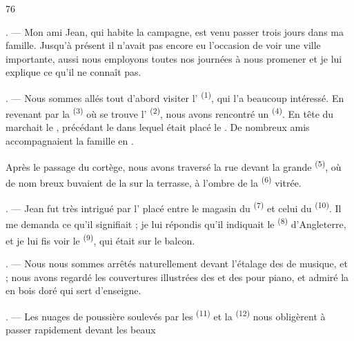 \begin{VUpage}[78]{76}
\VUsaut{4.0mm}
\VUsaut{3.0mm}

\VUsaut{3.0mm}

. --- Mon ami Jean, qui habite la campagne, est venu\nl
passer trois jours dans ma famille. Jusqu'à présent il\nl
n'avait pas encore eu l'occasion de voir une ville\nl
importante, aussi nous employons toutes nos journées\nl
à nous promener et je lui explique ce qu'il ne connaît\nl
pas.

. --- Nous sommes allés tout d'abord visiter\nl
l' \textsuperscript{(1)}, qui l'a beaucoup intéressé. En\nl
revenant par la  \textsuperscript{(3)} où se trouve l'\nl
{} \textsuperscript{(2)}, nous avons rencontré un \cc
{} \textsuperscript{(4)}. En tête du  marchait le\nl
{}, précédant le  dans lequel était\nl
placé le . De nombreux amis accompagnaient\nl
la famille en .

\VUblancAlinea
Après le passage du cortège, nous avons traversé\nl
la rue devant la grande  \textsuperscript{(5)}, où de nom\cc
breux  buvaient de la  sur la\nl
terrasse, à l'ombre de la  \textsuperscript{(6)} vitrée.

. --- Jean fut très intrigué par l' placé\nl
entre le magasin du  \textsuperscript{(7)} et celui du \cc
{} \textsuperscript{(10)}. Il me demanda ce qu'il\nl
signifiait ; je lui répondis qu'il indiquait le \textsuperscript{(8)}\nl
d'Angleterre, et je lui fis voir le  \textsuperscript{(9)}, qui était\nl
sur le balcon.

. --- Nous nous sommes arrêtés naturellement\nl
devant l'étalage des  de musique, \cc
{} et  ; nous avons regardé\nl
les couvertures illustrées des  et des\nl
{} pour piano, et admiré la  en bois\nl
doré qui sert d'enseigne.

. --- Les nuages de poussière soulevés par les\nl
{} \textsuperscript{(11)} et la  \textsuperscript{(12)}\nl
nous obligèrent à passer rapidement devant les beaux
\parplein
\end{VUpage}

